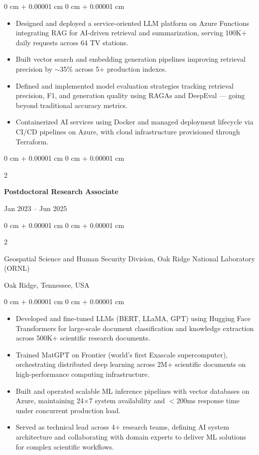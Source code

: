 \documentclass[10pt, letterpaper]{article}
\newenvironment{highlights}{
    \begin{itemize}[
        topsep=0.10 cm,
        parsep=0.10 cm,
        partopsep=0pt,
        itemsep=0pt,
        leftmargin=0 cm + 10pt
    ]
}{
    \end{itemize}
} %
\newenvironment{onecolentry}{
    \begin{adjustwidth}{
        0 cm + 0.00001 cm
    }{
        0 cm + 0.00001 cm
    }
}{
    \end{adjustwidth}
} %
\newenvironment{twocolentry}[2][]{
    \onecolentry
    \def\secondColumn{#2}
    \setcolumnwidth{\fill, 4.5 cm}
    \begin{paracol}{2}
}{
    \switchcolumn \raggedleft \secondColumn
    \end{paracol}
    \endonecolentry
} %
\begin{document}
    \begin{onecolentry}
        \begin{highlights}
            \item Designed and deployed a service-oriented LLM platform on Azure Functions integrating RAG for AI-driven retrieval and summarization, serving 100K+ daily requests across 64 TV stations.
            \item Built vector search and embedding generation pipelines improving retrieval precision by $\sim$35\% across 5+ production indexes.
            \item Defined and implemented model evaluation strategies tracking retrieval precision, F1, and generation quality using RAGAs and DeepEval — going beyond traditional accuracy metrics.
            \item Containerized AI services using Docker and managed deployment lifecycle via CI/CD pipelines on Azure, with cloud infrastructure provisioned through Terraform.
        \end{highlights}
    \end{onecolentry}

\vspace{1mm}

    \begin{twocolentry}{Jan 2023 -- Jun 2025}
        \textbf{Postdoctoral Research Associate}
    \end{twocolentry}
    \begin{twocolentry}{Oak Ridge, Tennessee, USA}
        Geospatial Science and Human Security Division, Oak Ridge National Laboratory (ORNL)
    \end{twocolentry}
    \vspace{0.10 cm}
    \begin{onecolentry}
        \begin{highlights}
            \item Developed and fine-tuned LLMs (BERT, LLaMA, GPT) using Hugging Face Transformers for large-scale document classification and knowledge extraction across 500K+ scientific research documents.
            \item Trained MatGPT on Frontier (world's first Exascale supercomputer), orchestrating distributed deep learning across 2M+ scientific documents on high-performance computing infrastructure.
            \item Built and operated scalable ML inference pipelines with vector databases on Azure, maintaining 24×7 system availability and $<$200ms response time under concurrent production load.
            \item Served as technical lead across 4+ research teams, defining AI system architecture and collaborating with domain experts to deliver ML solutions for complex scientific workflows.
        \end{highlights}
    \end{onecolentry}
\end{document}
